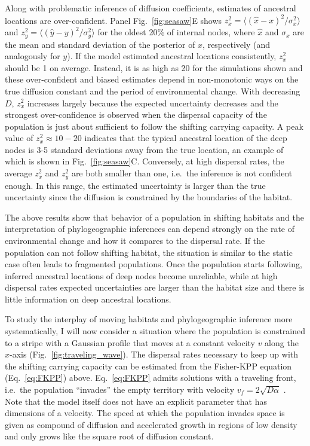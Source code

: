 \documentclass[aps,rmp, twocolumn]{revtex4}
\newcommand{\vfkpp}{v_f}
\begin{document}
Along with problematic inference of diffusion coefficients, estimates of ancestral locations are over-confident.
Panel Fig.~\ref{fig:seasaw}E shows $z_x^2 = \langle (\hat{x} - x)^2/\sigma_x^2 \rangle$ and $z_y^2=\langle (\hat{y} - y)^2/\sigma_y^2\rangle$ for the oldest 20\% of internal nodes, where $\hat{x}$ and $\sigma_x$ are the mean and standard deviation of the posterior of $x$, respectively (and analogously for $y$).
If the model estimated ancestral locations consistently, $z_x^2$ should be 1 on average.
Instead, it is as high as 20 for the simulations shown and these over-confident and biased estimates depend in non-monotonic ways on the true diffusion constant and the period of environmental change.
With decreasing $D$, $z_x^2$ increases largely because the expected uncertainty decreases and the strongest over-confidence is observed when the dispersal capacity of the population is just about sufficient to follow the shifting carrying capacity.
A peak value of $z_x^2\approx 10-20$ indicates that the typical ancestral location of the deep nodes is 3-5 standard deviations away from the true location, an example of which is shown in Fig.~\ref{fig:seasaw}C.
Conversely, at high dispersal rates, the average $z_x^2$ and $z_y^2$ are both smaller than one, i.e.~the inference is not confident enough.
In this range, the estimated uncertainty is larger than the true uncertainty since the diffusion is constrained by the boundaries of the habitat.


The above results show that behavior of a population in shifting habitats and the interpretation of phylogeographic inferences can depend strongly on the rate of environmental change and how it compares to the dispersal rate.
If the population can not follow shifting habitat, the situation is similar to the static case often leads to fragmented populations.
Once the population starts following, inferred ancestral locations of deep nodes become unreliable, while at high dispersal rates expected uncertainties are larger than the habitat size and there is little information on deep ancestral locations.

To study the interplay of moving habitats and phylogeographic inference more systematically, I will now consider a situation where the population is constrained to a stripe with a Gaussian profile that moves at a constant velocity $v$ along the $x$-axis (Fig.~\ref{fig:traveling_wave}).
The dispersal rates necessary to keep up with the shifting carrying capacity can be estimated from the Fisher-KPP equation (Eq.~\ref{eq:FKPP}) above.
Eq.~\ref{eq:FKPP} admits solutions with a traveling front, i.e.~the population ``invades'' the empty territory with velocity $\vfkpp = 2\sqrt{D \alpha}$ \citep{fisher_wave_1937,KPP1937,hallatschek_life_2010}.
Note that the model itself does not have an explicit parameter that has dimensions of a velocity.
The speed at which the population invades space is given as compound of diffusion and accelerated growth in regions of low density and only grows like the square root of diffusion constant.
\end{document}
